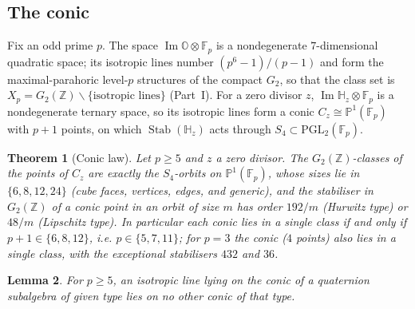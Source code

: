 \documentclass[11pt]{amsart}
\newtheorem{theorem}{Theorem}[section]
\newtheorem{lemma}[theorem]{Lemma}
\theoremstyle{definition}
\renewcommand{\O}{\mathbb{O}}\newcommand{\Sd}{\mathbb{S}}\newcommand{\Hq}{\mathbb{H}}\newcommand{\Z}{\mathbb{Z}}\newcommand{\Q}{\mathbb{Q}}\newcommand{\R}{\mathbb{R}}\newcommand{\C}{\mathbb{C}}\newcommand{\F}{\mathbb{F}}
\newcommand{\Stab}{\operatorname{Stab}}\newcommand{\Aut}{\operatorname{Aut}}\newcommand{\Der}{\operatorname{Der}}\renewcommand{\Im}{\operatorname{Im}}
\begin{document}
\subsection{The conic}
Fix an odd prime $p$. The space $\Im\O\otimes\F_p$ is a nondegenerate $7$-dimensional quadratic space; its isotropic lines number $(p^6-1)/(p-1)$ and form the maximal-parahoric level-$p$ structures of the compact $G_2$, so that the class set is $X_p=G_2(\Z)\backslash\{\text{isotropic lines}\}$ (Part~I). For a zero divisor $z$, $\Im\Hq_z\otimes\F_p$ is a nondegenerate ternary space, so its isotropic lines form a conic $C_z\cong\mathbb P^1(\F_p)$ with $p+1$ points, on which $\Stab(\Hq_z)$ acts through $S_4\subset\mathrm{PGL}_2(\F_p)$.

\begin{theorem}[Conic law]\label{thm:conic}
Let $p\ge 5$ and $z$ a zero divisor. The $G_2(\Z)$-classes of the points of $C_z$ are exactly the $S_4$-orbits on $\mathbb P^1(\F_p)$, whose sizes lie in $\{6,8,12,24\}$ (cube faces, vertices, edges, and generic), and the stabiliser in $G_2(\Z)$ of a conic point in an orbit of size $m$ has order $192/m$ (Hurwitz type) or $48/m$ (Lipschitz type). In particular each conic lies in a single class if and only if $p+1\in\{6,8,12\}$, i.e. $p\in\{5,7,11\}$; for $p=3$ the conic ($4$ points) also lies in a single class, with the exceptional stabilisers $432$ and $36$.
\end{theorem}
\begin{lemma}\label{lem:unique}
For $p\ge 5$, an isotropic line lying on the conic of a quaternion subalgebra of given type lies on no other conic of that type.
\end{lemma}
\end{document}

